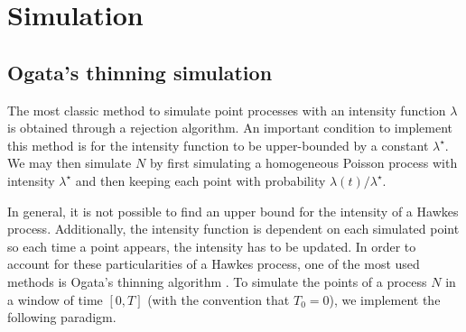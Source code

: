 
\section{Simulation}\label{sec:chap1_simulation}

\subsection{Ogata's thinning simulation}

The most classic method to simulate point processes with an intensity function $\lambda$ is obtained through a rejection algorithm. An important condition to implement this method is for the intensity function to be upper-bounded by a constant $\lambda^\star$.
We may then simulate $N$ by first simulating a homogeneous Poisson process with intensity $\lambda^\star$ and then keeping each point with probability $\lambda(t) / \lambda^\star$.

In general, it is not possible to find an upper bound for the intensity of a Hawkes process. Additionally, the intensity function is dependent on each simulated point so each time a point appears, the intensity has to be updated. In order to account for these particularities of a Hawkes process, one of the most used methods is Ogata's thinning algorithm \parencite{Ogata1981}.
To simulate the points of a process $N$ in a window of time $[0,T]$ (with the convention that $T_0 = 0$), we implement the following paradigm.

